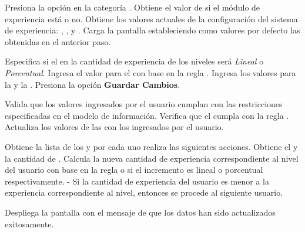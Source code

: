 \begin{UCtrayectoria}%
%
   

  \Actor Presiona la opción {\bf {}} en la categoría
         . 
  \Sistema Obtiene el valor de si el módulo de experiencia está  o no.  \label{CU-E02-2-loading}
  \Sistema Obtiene los valores actuales de la configuración del sistema de experiencia:
           ,
           ,
            y
           .
  \Sistema Carga la pantalla  estableciendo como valores por defecto
           las  obtenidas en el anterior paso.

  \Actor Especifica si el  en la cantidad de
         experiencia de los niveles será {\it Lineal} o {\it Porcentual}.
  \Actor Ingresa el valor para el  con
         base en la regla .
  \Actor Ingresa los valores para la  y la
         .
  \Actor Presiona la opción {\bf Guardar Cambios}.  \label{CU-E02-2-submit}

  \Sistema Valida que los valores ingresados por el usuario cumplan con las
           restricciones especificadas en el modelo de información.
  \Sistema Verifica que el  cumpla
           con la regla . 
  \Sistema Actualiza los valores de las  con los
           ingresados por el usuario.

  \Sistema Obtiene la lista de los  y por cada uno
           realiza las siguientes acciones.
  \Sistema Obtiene el  y la cantidad de .
  \Sistema Calcula la nueva cantidad de experiencia correspondiente al nivel del usuario con
           base en la regla  o  si el incremento es lineal o
           porcentual respectivamente.
  \Sistema - Si la cantidad de experiencia del usuario es menor a la experiencia correspondiente
           al nivel, entonces se procede al siguiente usuario.  \label{CU-E02-2-Usuarios}

  \Sistema Despliega la pantalla  con el mensaje de que los datos
           han sido actualizados exitosamente.

\end{UCtrayectoria}

